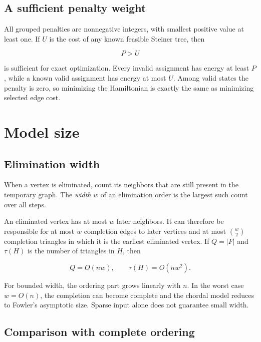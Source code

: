 \documentclass[10pt,a4paper]{article}
\begin{document}
\subsection{A sufficient penalty weight}

All grouped penalties are nonnegative integers, with smallest positive value
at least one. If $U$ is the cost of any known feasible Steiner tree, then

\begin{equation}
P>U
\label{eq:penalty-bound}
\end{equation}

is sufficient for exact optimization. Every invalid assignment has energy at
least $P$, while a known valid assignment has energy at most $U$. Among valid
states the penalty is zero, so minimizing the Hamiltonian is exactly the same
as minimizing selected edge cost.

\section{Model size}

\subsection{Elimination width}

When a vertex is eliminated, count its neighbors that are still present in
the temporary graph. The \emph{width} $w$ of an elimination order is the
largest such count over all steps.

An eliminated vertex has at most $w$ later neighbors. It can therefore be
responsible for at most $w$ completion edges to later vertices and at most
$\binom{w}{2}$ completion triangles in which it is the earliest eliminated
vertex. If $Q=|F|$ and $\tau(H)$ is the number of triangles in $H$, then

\begin{equation}
Q=O(nw),
\qquad
\tau(H)=O(nw^2).
\label{eq:width-bounds}
\end{equation}

For bounded width, the ordering part grows linearly with $n$. In the worst
case $w=O(n)$, the completion can become complete and the chordal model reduces
to Fowler's asymptotic size. Sparse input alone does not guarantee small width.

\subsection{Comparison with complete ordering}
\end{document}
